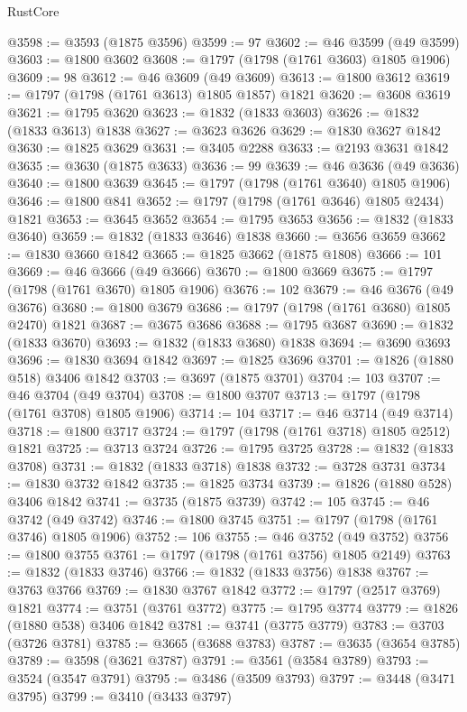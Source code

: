 \begin{lexlean}{RustCore}
\begin{coremodule}
@3598 := @3593 (@1875 @3596)
@3599 := 97
@3602 := @46 @3599 (@49 @3599)
@3603 := @1800 @3602
@3608 := @1797 (@1798 (@1761 @3603) @1805 @1906)
@3609 := 98
@3612 := @46 @3609 (@49 @3609)
@3613 := @1800 @3612
@3619 := @1797 (@1798 (@1761 @3613) @1805 @1857) @1821
@3620 := @3608 @3619
@3621 := @1795 @3620
@3623 := @1832 (@1833 @3603)
@3626 := @1832 (@1833 @3613) @1838
@3627 := @3623 @3626
@3629 := @1830 @3627 @1842
@3630 := @1825 @3629
@3631 := @3405 @2288
@3633 := @2193 @3631 @1842
@3635 := @3630 (@1875 @3633)
@3636 := 99
@3639 := @46 @3636 (@49 @3636)
@3640 := @1800 @3639
@3645 := @1797 (@1798 (@1761 @3640) @1805 @1906)
@3646 := @1800 @841
@3652 := @1797 (@1798 (@1761 @3646) @1805 @2434) @1821
@3653 := @3645 @3652
@3654 := @1795 @3653
@3656 := @1832 (@1833 @3640)
@3659 := @1832 (@1833 @3646) @1838
@3660 := @3656 @3659
@3662 := @1830 @3660 @1842
@3665 := @1825 @3662 (@1875 @1808)
@3666 := 101
@3669 := @46 @3666 (@49 @3666)
@3670 := @1800 @3669
@3675 := @1797 (@1798 (@1761 @3670) @1805 @1906)
@3676 := 102
@3679 := @46 @3676 (@49 @3676)
@3680 := @1800 @3679
@3686 := @1797 (@1798 (@1761 @3680) @1805 @2470) @1821
@3687 := @3675 @3686
@3688 := @1795 @3687
@3690 := @1832 (@1833 @3670)
@3693 := @1832 (@1833 @3680) @1838
@3694 := @3690 @3693
@3696 := @1830 @3694 @1842
@3697 := @1825 @3696
@3701 := @1826 (@1880 @518) @3406 @1842
@3703 := @3697 (@1875 @3701)
@3704 := 103
@3707 := @46 @3704 (@49 @3704)
@3708 := @1800 @3707
@3713 := @1797 (@1798 (@1761 @3708) @1805 @1906)
@3714 := 104
@3717 := @46 @3714 (@49 @3714)
@3718 := @1800 @3717
@3724 := @1797 (@1798 (@1761 @3718) @1805 @2512) @1821
@3725 := @3713 @3724
@3726 := @1795 @3725
@3728 := @1832 (@1833 @3708)
@3731 := @1832 (@1833 @3718) @1838
@3732 := @3728 @3731
@3734 := @1830 @3732 @1842
@3735 := @1825 @3734
@3739 := @1826 (@1880 @528) @3406 @1842
@3741 := @3735 (@1875 @3739)
@3742 := 105
@3745 := @46 @3742 (@49 @3742)
@3746 := @1800 @3745
@3751 := @1797 (@1798 (@1761 @3746) @1805 @1906)
@3752 := 106
@3755 := @46 @3752 (@49 @3752)
@3756 := @1800 @3755
@3761 := @1797 (@1798 (@1761 @3756) @1805 @2149)
@3763 := @1832 (@1833 @3746)
@3766 := @1832 (@1833 @3756) @1838
@3767 := @3763 @3766
@3769 := @1830 @3767 @1842
@3772 := @1797 (@2517 @3769) @1821
@3774 := @3751 (@3761 @3772)
@3775 := @1795 @3774
@3779 := @1826 (@1880 @538) @3406 @1842
@3781 := @3741 (@3775 @3779)
@3783 := @3703 (@3726 @3781)
@3785 := @3665 (@3688 @3783)
@3787 := @3635 (@3654 @3785)
@3789 := @3598 (@3621 @3787)
@3791 := @3561 (@3584 @3789)
@3793 := @3524 (@3547 @3791)
@3795 := @3486 (@3509 @3793)
@3797 := @3448 (@3471 @3795)
@3799 := @3410 (@3433 @3797)

\end{coremodule}
\end{lexlean}
